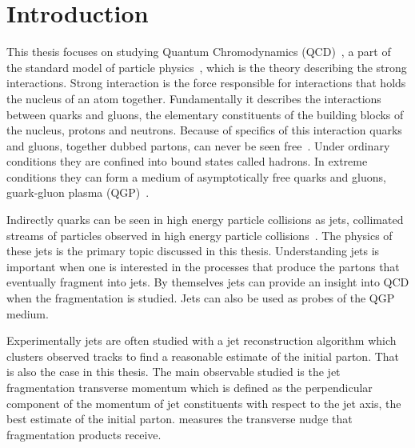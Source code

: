 
%
%
\tableofcontents

\clearpage
\section{Introduction}
\label{sec:introduction}
This thesis focuses on studying Quantum Chromodynamics (QCD)~\cite{gross1973asymptotically}, a part of the standard model of particle physics~\cite{Tanabashi:2018oca}, which is the theory describing the strong interactions. Strong interaction is the force responsible for interactions that holds the nucleus of an atom together. Fundamentally it describes the interactions between quarks and gluons, the elementary constituents of the building blocks of the nucleus, protons and neutrons. Because of specifics of this interaction quarks and gluons, together dubbed partons, can never be seen free~\cite{Perl:2004qc}. Under ordinary conditions they are confined into bound states called hadrons. In extreme conditions they can form a medium of asymptotically free quarks and gluons, guark-gluon plasma (QGP)~\cite{Shuryak:1980}. %

Indirectly quarks can be seen in high energy particle collisions as jets, collimated streams of particles observed in high energy particle collisions~\cite{Perkins:1982xb}. The physics of these jets is the primary topic discussed in this thesis. Understanding jets is important when one is interested in the processes that produce the partons that eventually fragment into jets. By themselves jets can provide an insight into QCD when the fragmentation is studied. Jets can also be used as probes of the QGP medium. 

Experimentally jets are often studied with a jet reconstruction algorithm which clusters observed tracks to find a reasonable estimate of the initial parton. That is also the case in this thesis. The main observable studied is the jet fragmentation transverse momentum \jt{} which is defined as the perpendicular component of the momentum of jet constituents with respect to the jet axis, the best estimate of the initial parton. \jt{} measures the transverse nudge that fragmentation products receive.

